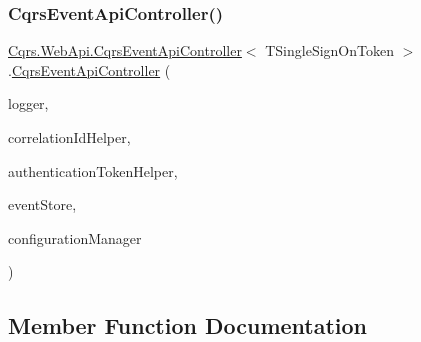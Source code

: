 \subsubsection{\texorpdfstring{Cqrs\+Event\+Api\+Controller()}{CqrsEventApiController()}}
{\footnotesize\ttfamily \hyperlink{classCqrs_1_1WebApi_1_1CqrsEventApiController}{Cqrs.\+Web\+Api.\+Cqrs\+Event\+Api\+Controller}$<$ T\+Single\+Sign\+On\+Token $>$.\hyperlink{classCqrs_1_1WebApi_1_1CqrsEventApiController}{Cqrs\+Event\+Api\+Controller} (\begin{DoxyParamCaption}\item[{I\+Logger}]{logger,  }\item[{I\+Correlation\+Id\+Helper}]{correlation\+Id\+Helper,  }\item[{\hyperlink{interfaceCqrs_1_1Authentication_1_1IAuthenticationTokenHelper}{I\+Authentication\+Token\+Helper}$<$ T\+Single\+Sign\+On\+Token $>$}]{authentication\+Token\+Helper,  }\item[{\hyperlink{interfaceCqrs_1_1Events_1_1IEventStore}{I\+Event\+Store}$<$ T\+Single\+Sign\+On\+Token $>$}]{event\+Store,  }\item[{\hyperlink{interfaceCqrs_1_1Configuration_1_1IConfigurationManager}{I\+Configuration\+Manager}}]{configuration\+Manager }\end{DoxyParamCaption})\hspace{0.3cm}{\ttfamily [protected]}}



\subsection{Member Function Documentation}
\mbox{\label{classCqrs_1_1WebApi_1_1CqrsEventApiController_aac0079ced115761a0ab605eaebe0801b_aac0079ced115761a0ab605eaebe0801b}} 
